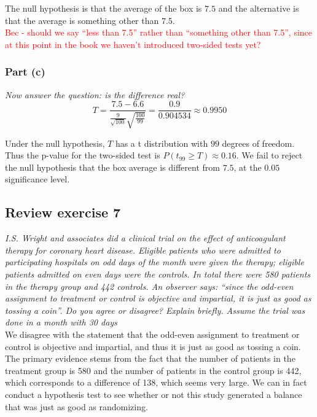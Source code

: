 \documentclass[11pt]{article}
\begin{document}
\noindent The null hypothesis is that the average of the box is $7.5$ and the alternative is that the average is something other than $7.5$.\\
\noindent \textcolor{red}{Bec - should we say ``less than 7.5'' rather than ``something other than 7.5'', since at this point in the book we haven't introduced two-sided tests yet?}
\subsubsection*{Part (c)}
\noindent \emph{Now answer the question: is the difference real?}\\

$$T= \frac{7.5 - 6.6}{\frac{9}{\sqrt{100}}\sqrt{\frac{100}{99}}} = \frac{0.9}{0.904534} \approx 0.9950$$

Under the null hypothesis, $T$ has a t distribution with $99$ degrees of freedom.  Thus the p-value for the two-sided test is $ P(t_{99} \geq T) \approx 0.16$.  We fail to reject the null hypothesis that the box average is different from $7.5$, at the $0.05$ significance level.



\subsection*{Review exercise 7} %
\noindent \emph{I.S. Wright and associates did a clinical trial on the effect of anticoagulant therapy for coronary heart disease. Eligible patients who were admitted to participating hospitals on odd days of the month were given the therapy; eligible patients admitted on even days were the controls. In total there were 580 patients in the therapy group and 442 controls. An observer says: ``since the odd-even assignment to treatment or control is objective and impartial, it is just as good as tossing a coin''. Do you agree or disagree? Explain briefly. Assume the trial was done in a month with 30 days}\\

\noindent We disagree with the statement that the odd-even assignment to treatment or control is objective and impartial, and thus it is just as good as tossing a coin. The primary evidence stems from the fact that the number of patients  in the treatment group is 580 and the number of patients in the control group is 442, which corresponds to a difference of 138, which seems very large. We can in fact conduct a hypothesis test to see whether or not this study generated a balance that was just as good as randomizing.\\
\end{document}
